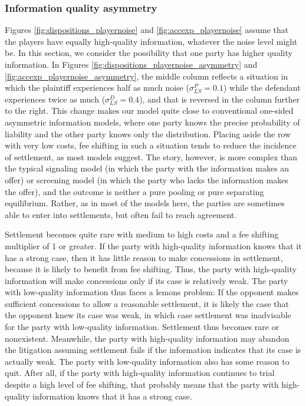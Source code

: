 \documentclass{article}
\begin{document}
\subsubsection{Information quality asymmetry}

Figures \ref{fig:dispositions_playernoise} and \ref{fig:accexp_playernoise} assume that the players have equally high-quality information, whatever the noise level might be. In this section, we consider the possibility that one party has higher quality information. In Figures \ref{fig:dispositions_playernoise_asymmetry} and \ref{fig:accexp_playernoise_asymmetry}, the middle column reflects a situation in which the plaintiff experiences half as much noise ($\sigma_{LS}^P=0.1$) while the defendant experiences twice as much ($\sigma_{LS}^D=0.4$), and that is reversed in the column further to the right. This change makes our model quite close to conventional one-sided asymmetric information models, where one party knows the precise probability of liability and the other party knows only the distribution. Placing aside the row with very low costs, fee shifting in such a situation tends to reduce the incidence of settlement, as most models suggest. The story, however, is more complex than the typical signaling model (in which the party with the information makes an offer) or screening model (in which the party who lacks the information makes the offer), and the outcome is neither a pure pooling or pure separating equilibrium. Rather, as in most of the models here, the parties are sometimes able to enter into settlements, but often fail to reach agreement. 

Settlement becomes quite rare with medium to high costs and a fee shifting multiplier of 1 or greater. If the party with high-quality information knows that it has a strong case, then it has little reason to make concessions in settlement, because it is likely to benefit from fee shifting. Thus, the party with high-quality information will make concessions only if its case is relatively weak. The party with low-quality information thus faces a lemons problem: If the opponent makes sufficient concessions to allow a reasonable settlement, it is likely the case that the opponent knew its case was weak, in which case settlement was inadvisable for the party with low-quality information. Settlement thus becomes rare or nonexistent. Meanwhile, the party with high-quality information may abandon the litigation assuming settlement fails if the information indicates that its case is actually weak. The party with low-quality information also has some reason to quit. After all, if the party with high-quality information continues to trial despite a high level of fee shifting, that probably means that the party with high-quality information knows that it has a strong case. 
\end{document}
